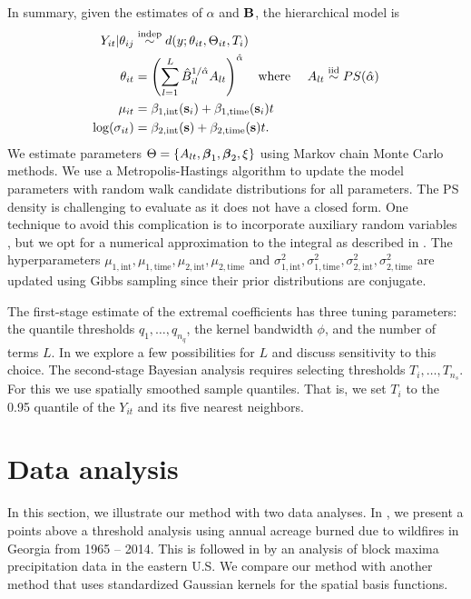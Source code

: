 In summary, given the estimates of $\alpha$ and $\mathbf{B}$, the hierarchical model is
\begin{align} \label{ebeq:bayesmodel}
  Y_{it} |\theta_{ij} &\stackrel{\text{indep}}{\sim} d(y;\theta_{it},\Theta_{it}, T_i) \\
  \theta_{it} &= \left(\sum_{l=1}^L{\hat B}_{il}^{1/\hat{\alpha}}A_{lt}\right)^{\hat{\alpha}}
  \text{\ \ \ where \ \ \ }
  A_{lt} \stackrel{\mathrm{iid}}{\sim} PS(\hat{\alpha})\nonumber\\
  \mu_{it} &= \beta_{1, \text{int}}(\mathbf{s}_i) + \beta_{1, \text{time}}(\mathbf{s}_i) t \nonumber \\
  \log(\sigma_{it}) &= \beta_{2, \text{int}}(\mathbf{s}) + \beta_{2, \text{time}}(\mathbf{s}) t. \nonumber
\end{align}
We estimate parameters $\Theta = \left\{A_{lt}, \mbox{\boldmath $\beta$}_1, \mbox{\boldmath $\beta$}_2, \xi \right\}$ using Markov chain Monte Carlo methods.
We use a Metropolis-Hastings algorithm to update the model parameters with random walk candidate distributions for all parameters.
The PS density is challenging to evaluate as it does not have a closed form.
One technique to avoid this complication is to incorporate auxiliary random variables \citep{Stephenson2009}, but we opt for a numerical approximation to the integral as described in .
The hyperparameters $\mu_{1, \text{int}}, \mu_{1, \text{time}}, \mu_{2, \text{int}}, \mu_{2, \text{time}}$ and $\sigma^2_{1, \text{int}}, \sigma^2_{1, \text{time}}, \sigma^2_{2, \text{int}}, \sigma^2_{2, \text{time}}$ are updated using Gibbs sampling since their prior distributions are conjugate.

The first-stage estimate of the extremal coefficients has three tuning parameters: the quantile thresholds $q_1,\ldots,q_{n_q}$, the kernel bandwidth $\phi$, and the number of terms $L$.
In  we explore a few possibilities for $L$ and discuss sensitivity to this choice.
The second-stage Bayesian analysis requires selecting thresholds $T_i,\ldots,T_{n_s}$.  For this we use spatially smoothed sample quantiles.
That is, we set $T_i$ to the 0.95 quantile of the $Y_{it}$ and its five nearest neighbors.

\section{Data analysis}\label{ebs:analysis}

In this section, we illustrate our method with two data analyses.
In , we present a points above a threshold analysis using annual acreage burned due to wildfires in Georgia from 1965 -- 2014.
This is followed in  by an analysis of block maxima precipitation data in the eastern U.S.
We compare our method with another method that uses standardized Gaussian kernels for the spatial basis functions.

